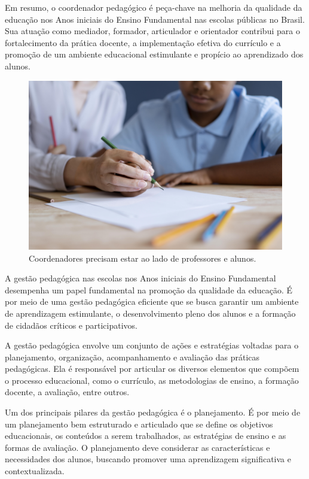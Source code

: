 Em resumo, o coordenador pedagógico é peça-chave na melhoria da
qualidade da educação nos Anos iniciais do Ensino Fundamental nas
escolas públicas no Brasil. Sua atuação como mediador, formador,
articulador e orientador contribui para o fortalecimento da prática
docente, a implementação efetiva do currículo e a promoção de um
ambiente educacional estimulante e propício ao aprendizado dos alunos.

\begin{figure}
\centering
\includegraphics[width=\textwidth]{./imgs/Imagem004.jpg}
\caption{Coordenadores precisam estar ao lado de professores e alunos.}
\end{figure}

A gestão pedagógica nas escolas nos Anos iniciais do Ensino Fundamental
desempenha um papel fundamental na promoção da qualidade da educação. É
por meio de uma gestão pedagógica eficiente que se busca garantir um
ambiente de aprendizagem estimulante, o desenvolvimento pleno dos alunos
e a formação de cidadãos críticos e participativos.

A gestão pedagógica envolve um conjunto de ações e estratégias voltadas
para o planejamento, organização, acompanhamento e avaliação das
práticas pedagógicas. Ela é responsável por articular os diversos
elementos que compõem o processo educacional, como o currículo, as
metodologias de ensino, a formação docente, a avaliação, entre outros.

Um dos principais pilares da gestão pedagógica é o planejamento. É por
meio de um planejamento bem estruturado e articulado que se define os
objetivos educacionais, os conteúdos a serem trabalhados, as estratégias
de ensino e as formas de avaliação. O planejamento deve considerar as
características e necessidades dos alunos, buscando promover uma
aprendizagem significativa e contextualizada.

